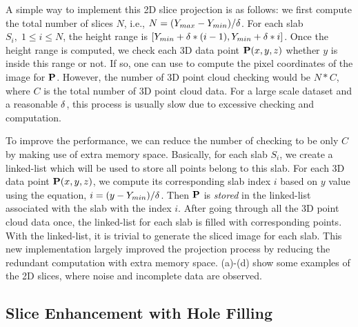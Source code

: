 A simple way to implement this 2D slice projection is as follows:
we first compute the total number of slices $N$, i.e.,
$N = (Y_{max} - Y_{min} )/{\bf \delta}$.
For each slab $S_i, \; 1 \le i \le N$,
the height range is $[Y_{min} + {\bf \delta} * (i-1), Y_{min} + {\bf \delta} * i]$.
Once the height range is computed,
we check each 3D data point ${\bf P}(x,y,z)$
whether $y$ is inside this range or not.
If so, one can use  to
compute the pixel coordinates of the image for ${\bf P}$.
However, the number of 3D point cloud checking would be $N * C$,
where $C$ is the total number of 3D point cloud data.
For a large scale dataset and a reasonable ${\bf \delta}$, this process
is usually slow due to excessive checking and computation.

To improve the performance, we can reduce the number of checking to
be only $C$ by making use of extra memory space.
Basically, for each slab $S_i$, we create a linked-list
which will be used to store all points belong to this slab.
For each 3D data point ${\bf P}(x, y, z)$, we compute its
corresponding slab index $i$ based on $y$ value using the equation,
$i = (y - Y_{min})/{\bf \delta}$.
Then ${\bf P}$ is {\it stored} in the linked-list associated with
the slab with the index $i$.
After going through all the 3D point cloud data once,
the linked-list for each slab is filled with corresponding points.
With the linked-list, it is trivial to generate the sliced image for each slab.
This new implementation largely improved the projection process by reducing
the redundant computation with extra memory space.
(a)-(d) show some examples of the 2D slices, where noise
and incomplete data are observed.


\subsection{Slice Enhancement with Hole Filling}
\label{sec:mdr}

